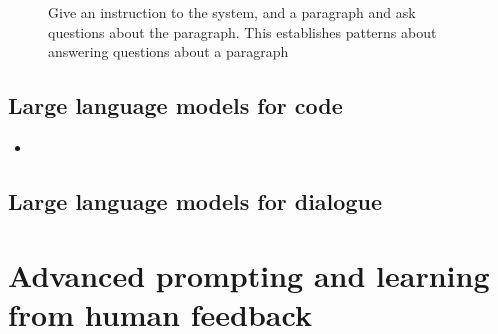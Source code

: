 \documentclass[11pt]{article}
\begin{document}
\begin{figure}[H]
    \centering
    \caption*{Give an instruction to the system, and a paragraph and ask questions about the paragraph. This establishes patterns about answering questions about a paragraph}
\end{figure}    

\subsection{Large language models for code}

\begin{minipage}[l]{.5\linewidth}
    \begin{figure}[H]
        \centering
    \end{figure}    
\end{minipage}\hfill
\begin{minipage}[r]{.48\linewidth}
    \begin{itemize}
        \item
    \end{itemize}
\end{minipage}

\subsection{Large language models for dialogue}

\begin{figure}[H]
    \centering
\end{figure}    

\section{Advanced prompting and learning from human feedback}
\end{document}
